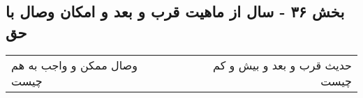 \begin{center}
\section*{بخش ۳۶ - سال از ماهیت قرب و بعد و امکان وصال با حق}
\label{sec:sh036}
\begin{longtable}{l p{0.5cm} r}
وصال ممکن و واجب به هم چیست
&&
حدیث قرب و بعد و بیش و کم چیست
\\
\end{longtable}
\end{center}
